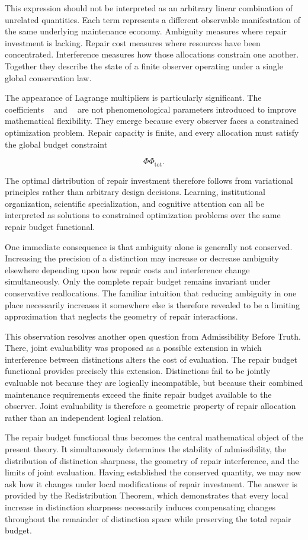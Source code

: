 \documentclass[12pt,oneside]{article}
\theoremstyle{plain}
\theoremstyle{definition}
\theoremstyle{remark}
\begin{document}
This expression should not be interpreted as an arbitrary linear combination of unrelated quantities. Each term represents a different observable manifestation of the same underlying maintenance economy. Ambiguity measures where repair investment is lacking. Repair cost measures where resources have been concentrated. Interference measures how those allocations constrain one another. Together they describe the state of a finite observer operating under a single global conservation law.

The appearance of Lagrange multipliers is particularly significant. The coefficients \lambda and \mu are not phenomenological parameters introduced to improve mathematical flexibility. They emerge because every observer faces a constrained optimization problem. Repair capacity is finite, and every allocation must satisfy the global budget constraint

\[
\Phi
\Phi_{\mathrm{tot}}.
\]

The optimal distribution of repair investment therefore follows from variational principles rather than arbitrary design decisions. Learning, institutional organization, scientific specialization, and cognitive attention can all be interpreted as solutions to constrained optimization problems over the same repair budget functional.

One immediate consequence is that ambiguity alone is generally not conserved. Increasing the precision of a distinction may increase or decrease ambiguity elsewhere depending upon how repair costs and interference change simultaneously. Only the complete repair budget remains invariant under conservative reallocations. The familiar intuition that reducing ambiguity in one place necessarily increases it somewhere else is therefore revealed to be a limiting approximation that neglects the geometry of repair interactions.

This observation resolves another open question from Admissibility Before Truth. There, joint evaluability was proposed as a possible extension in which interference between distinctions alters the cost of evaluation. The repair budget functional provides precisely this extension. Distinctions fail to be jointly evaluable not because they are logically incompatible, but because their combined maintenance requirements exceed the finite repair budget available to the observer. Joint evaluability is therefore a geometric property of repair allocation rather than an independent logical relation.

The repair budget functional thus becomes the central mathematical object of the present theory. It simultaneously determines the stability of admissibility, the distribution of distinction sharpness, the geometry of repair interference, and the limits of joint evaluation. Having established the conserved quantity, we may now ask how it changes under local modifications of repair investment. The answer is provided by the Redistribution Theorem, which demonstrates that every local increase in distinction sharpness necessarily induces compensating changes throughout the remainder of distinction space while preserving the total repair budget.
\end{document}
